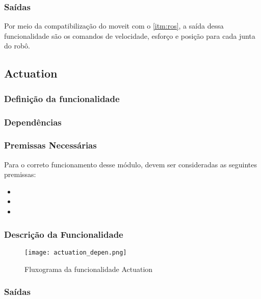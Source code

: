 \subsubsection{Saídas}
Por meio da compatibilização do \gls{moveit} com o \ref{itm:ros}, a saída dessa funcionalidade são os comandos de velocidade, esforço e posição para cada junta do robô.
\subsection{Actuation}
\subsubsection{Definição da funcionalidade}
\lipsum[2]
\subsubsection{Dependências}
\lipsum[5]

\subsubsection{Premissas Necessárias}
Para o correto funcionamento desse módulo, devem ser consideradas as seguintes premissas:
\begin{itemize}
	\item \lipsum[1]
	\item \lipsum[1]
	\item \lipsum[1]
\end{itemize}
\subsubsection{Descrição da Funcionalidade}
\lipsum[5]
	\begin{figure}[h]
		\centering
		\texttt{[image: actuation\_depen.png]}
		\caption{Fluxograma da funcionalidade Actuation}
		\label{fig:depen_actuation}
	\end{figure}
\subsubsection{Saídas}
\lipsum[2]












